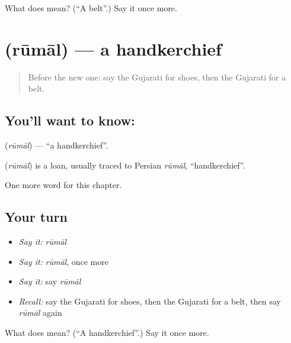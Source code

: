 \begin{tcolorbox}[breakable,colback=teal!4,colframe=teal!35!black,title={Before you move on}]
What does  mean? (\textquotedblleft{}A belt\textquotedblright{}.) Say it once more.
\end{tcolorbox}
\section[\texorpdfstring{\gu{રૂમાલ} (rūmāl)}{રૂમાલ (rūmāl)}]{ (rūmāl) — a handkerchief}

\label{lesson:GU-C112-rumal}



\begin{quote}
Before the new one: say the Gujarati for shoes, then the Gujarati for a belt.
\end{quote}

\subsection*{You'll want to know: }
\textbf{} (\emph{rūmāl}) — \textquotedblleft{}a handkerchief\textquotedblright{}.

\begin{cousinweb}
\textbf{} (\emph{rūmāl}) is a loan, usually traced to Persian \emph{rūmāl}, \textquotedblleft{}handkerchief\textquotedblright{}.
\end{cousinweb}

\begin{grammarlens}[title={What you've built}]
One more word for this chapter.
\end{grammarlens}

\subsection*{Your turn}
\begin{itemize}
\raggedright
  \item \emph{Say it:} \emph{rūmāl}
  \item \emph{Say it:} \emph{rūmāl}, once more
  \item \emph{Say it:} say \emph{rūmāl}
  \item \emph{Recall:} say the Gujarati for shoes, then the Gujarati for a belt, then say \emph{rūmāl} again
\end{itemize}

\begin{tcolorbox}[breakable,colback=teal!4,colframe=teal!35!black,title={Before you move on}]
What does  mean? (\textquotedblleft{}A handkerchief\textquotedblright{}.) Say it once more.
\end{tcolorbox}
